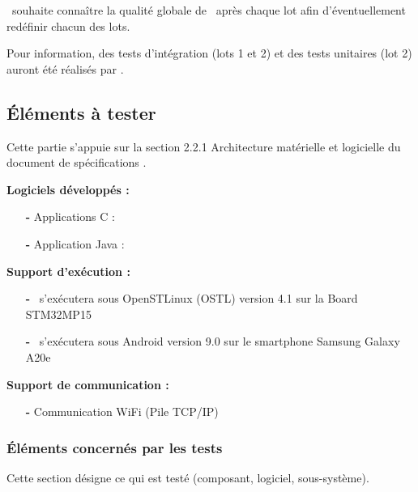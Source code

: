 \client~souhaite connaître la qualité globale de \produit~après chaque lot afin d'éventuellement redéfinir chacun des lots. 

Pour information, des tests d’intégration (lots 1 et 2) et des tests unitaires (lot 2) auront été réalisés par \equipe.



\subsection{Éléments à tester}
\label{sec:peri:elements} 


Cette partie s'appuie sur la section 2.2.1 Architecture matérielle et logicielle du document de spécifications . 

\medskip


\pagebreak

{\bf Logiciels développés :}\\
\begin{itemize}
    \item [\textbf{-}] Applications C : \appliC
    \item [\textbf{-}] Application Java : \appliA\\
\end{itemize}


{\bf Support d'exécution :}\\
\begin{itemize}
    \item [\textbf{-}] \appliLin~s'exécutera sous OpenSTLinux (OSTL) version 4.1 sur la Board STM32MP15
    \item [\textbf{-}] \appliA~s'exécutera sous Android version 9.0 sur le smartphone Samsung Galaxy A20e\\
\end{itemize}


{\bf Support de communication :}\\
\begin{itemize}
    \item [\textbf{-}] Communication WiFi (Pile TCP/IP)
\end{itemize}


\subsubsection{Éléments concernés par les tests}
\label{sec:peri:comp:test}
          
Cette section désigne ce qui est testé (composant, logiciel, sous-système).\\
          
